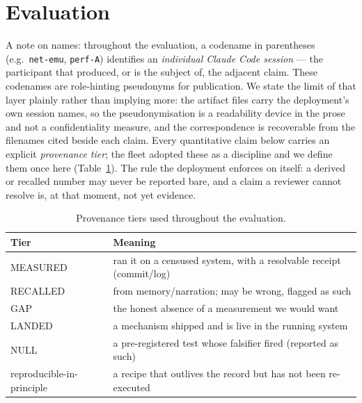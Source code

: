 \documentclass[10pt,conference]{IEEEtran}   %
\begin{document}
\section{Evaluation}
\label{sec:eval}
A note on names: throughout the evaluation, a codename in parentheses (e.g.\ \texttt{net-emu},
\texttt{perf-A}) identifies an \emph{individual Claude Code session} --- the participant that
produced, or is the subject of, the adjacent claim. These codenames are role-hinting pseudonyms for
publication. We state the limit of that layer plainly rather than implying more: the
artifact files carry the deployment's own session names, so the pseudonymisation is a readability
device in the prose and not a confidentiality measure, and the correspondence is recoverable from
the filenames cited beside each claim. Every quantitative
claim below carries an explicit \emph{provenance tier}; the fleet adopted these as
a discipline and we define them once here (Table~\ref{tab:prov}). The rule the deployment enforces on
itself: a derived or recalled number may never be reported bare, and a claim a reviewer cannot resolve
is, at that moment, not yet evidence.

\begin{table}[t]
\centering\footnotesize
\caption{Provenance tiers used throughout the evaluation.}
\label{tab:prov}
\begin{tabular}{@{}l p{}@{}}
\toprule
Tier & Meaning \\
\midrule
MEASURED & ran it on a censused system, with a resolvable receipt (commit/log) \\
RECALLED & from memory/narration; may be wrong, flagged as such \\
GAP & the honest absence of a measurement we would want \\
LANDED & a mechanism shipped and is live in the running system \\
NULL & a pre-registered test whose falsifier fired (reported as such) \\
reproducible-in-principle & a recipe that outlives the record but has not been re-executed \\
\bottomrule
\end{tabular}
\end{table}
\end{document}
